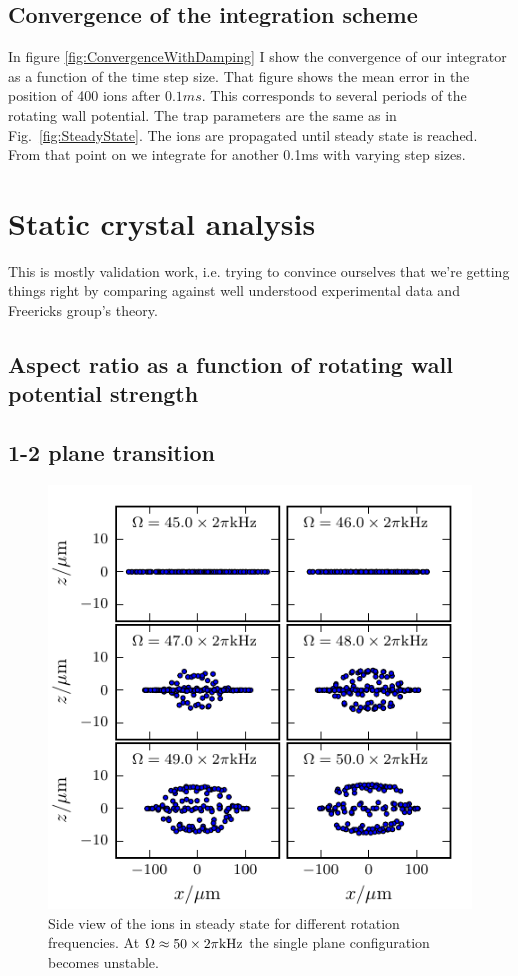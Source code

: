 \documentclass[
  aps,
  reprint,
  twoside,
  showpacs,
  amsmath,
  amssymb,
  floatfix
]{revtex4-1}
\begin{document}
\subsection{Convergence of the integration scheme}
\label{ssec:convergence}

In figure \ref{fig:ConvergenceWithDamping} I show the convergence of our
integrator as a function of the time step size.  That figure shows the
mean error in the position of 400 ions after $0.1ms$.  This corresponds
to several periods of the rotating wall potential.  The trap parameters
are the same as in Fig.~\ref{fig:SteadyState}.  The ions are propagated
until steady state is reached.  From that point on we integrate for
another 0.1ms with varying step sizes.


\section{Static crystal analysis}
\label{sec:static}

This is mostly validation work, i.e. trying to convince ourselves that
we're getting things right by comparing against well understood
experimental data and Freericks group's theory.

\subsection{Aspect ratio as a function of rotating wall potential
  strength}

\subsection{1-2 plane transition}

\begin{figure}
\center\includegraphics{./figures/sideViews.pdf}
\caption{Side view of the ions in steady state for different rotation
  frequencies.  At $\Omega\approx 50\times 2\pi {\rm kHz}$ the single
    plane configuration becomes unstable.}
\label{fig:SideViewsForVariousOmegas}
\end{figure}
\end{document}
